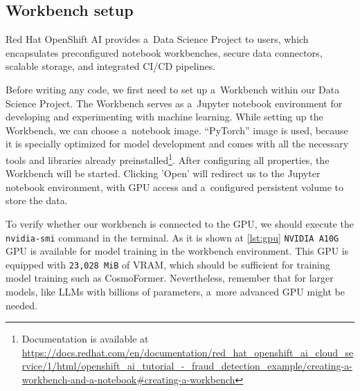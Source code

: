 \subsection*{Workbench setup}

Red Hat OpenShift AI provides a~Data Science Project to users, which encapsulates preconfigured notebook workbenches, secure data connectors, scalable storage, and integrated CI/CD pipelines.

\medskip

Before writing any code, we first need to set up a~Workbench within our Data Science Project. The Workbench serves as a~Jupyter notebook environment for developing and experimenting with machine learning. While setting up the Workbench, we can choose a~notebook image. \enquote{PyTorch} image is used, because it is specially optimized for model development and comes with all the necessary tools and libraries already preinstalled\footnote{Documentation is available at \url{https://docs.redhat.com/en/documentation/red_hat_openshift_ai_cloud_service/1/html/openshift_ai_tutorial_-_fraud_detection_example/creating-a-workbench-and-a-notebook\#creating-a-workbench}}. After configuring all properties, the Workbench will be started. Clicking 'Open' will redirect us to the Jupyter notebook environment, with GPU access and a~configured persistent volume to store the data. 

\medskip

To verify whether our workbench is connected to the GPU, we should execute the \texttt{nvidia-smi} command in the terminal. As it is shown at \autoref{lst:gpu} \texttt{NVIDIA A10G} GPU is available for model training in the workbench environment. This GPU is equipped with \texttt{23,028 MiB} of VRAM, which should be sufficient for training model training such as CosmoFormer. Nevertheless, remember that for larger models, like LLMs with billions of parameters, a~more advanced GPU might be needed.

\medskip

